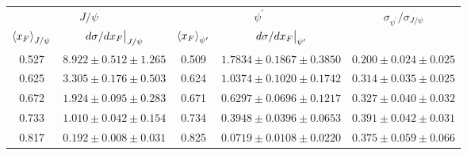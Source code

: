 \begin{tabular}{cc|cc|c}
\hline
\multicolumn{2}{c|}{$J/\psi$} &
  \multicolumn{2}{c|}{$\psi^{\prime}$} &
  \multirow{2}{*}{$\sigma_{\psi^\prime}/\sigma_{J/\psi}$} \\ \cline{1-4}
$\expval{x_F}_{J/\psi}$ &
  $\eval{d\sigma/dx_F}_{J/\psi}$ &
  $\expval{x_F}_{\psi^\prime}$ &
  $\eval{d\sigma/dx_F}_{\psi^\prime}$ &
   \\ \hline
\multicolumn{1}{c|}{0.527} &
  $8.922\pm0.512\pm1.265$ &
  \multicolumn{1}{c|}{0.509} &
  $1.7834\pm0.1867\pm0.3850$ &
  $0.200\pm0.024\pm0.025$ \\
\multicolumn{1}{c|}{0.625} &
  $3.305\pm0.176\pm0.503$ &
  \multicolumn{1}{c|}{0.624} &
  $1.0374\pm0.1020\pm0.1742$ &
  $0.314\pm0.035\pm0.025$ \\
\multicolumn{1}{c|}{0.672} &
  $1.924\pm0.095\pm0.283$ &
  \multicolumn{1}{c|}{0.671} &
  $0.6297\pm0.0696\pm0.1217$ &
  $0.327\pm0.040\pm0.032$ \\
\multicolumn{1}{c|}{0.733} &
  $1.010\pm0.042\pm0.154$ &
  \multicolumn{1}{c|}{0.734} &
  $0.3948\pm0.0396\pm0.0653$ &
  $0.391\pm0.042\pm0.031$ \\
\multicolumn{1}{c|}{0.817} &
  $0.192\pm0.008\pm0.031$ &
  \multicolumn{1}{c|}{0.825} &
  $0.0719\pm0.0108\pm0.0220$ &
  $0.375\pm0.059\pm0.066$ \\ \hline
\end{tabular}
